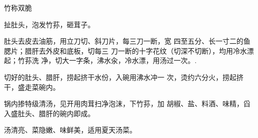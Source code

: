 \begin{recipe}{竹称双脆}

\ingredients



\cooking

\step 扯肚头，泡发竹荪，砸茸子。

肚头去皮去油筋，用立刀切、斜刀片，每三刀一断，宽 四至五分、长一寸二的鱼腮片；腊肝去外皮和底板，切每三 刀一断的十字花纹（切深不切断），均用冷水漂起；竹荪洗 净，切大一字条，沸水汆，冷水漂，用汤过一次。.

\step 切好的肚头、腊肝，捞起挤干水份，入碗用沸水冲一 次，烫约六分火，捞起挤干，盛走菜碗内。

\step 锅内掺特级清汤，见开用肉茸扫净泡沫，下竹荪，加 胡椒、盐、料酒、味精，舀入盛肚头、腊肝的碗内即成。

\notes

汤清亮、菜隐嫩、味鲜美，适用夏天汤菜。

\end{recipe}

